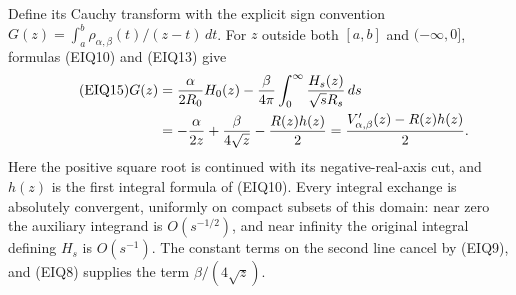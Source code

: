 Define its Cauchy transform with the explicit sign convention
$G(z)=\int_a^b\rho_{\alpha,\beta}(t)/(z-t)\,dt$.
For $z$ outside both $[a,b]$ and $(-\infty,0]$, formulas (EIQ10) and
(EIQ13) give
\begin{align}\tag{EIQ15}
 G(z)
 &=\frac\alpha{2R_0}H_0(z)
       -\frac\beta{4\pi}
          \int_0^\infty\frac{H_s(z)}{\sqrt sR_s}\,ds\\
 &=-\frac\alpha{2z}+\frac\beta{4\sqrt z}
       -\frac{R(z)h(z)}2
 =\frac{V'_{\alpha,\beta}(z)-R(z)h(z)}2.\notag
\end{align}
Here the positive square root is continued with its negative-real-axis
cut, and $h(z)$ is the first integral formula of (EIQ10).  Every integral
exchange is absolutely convergent, uniformly on compact subsets of this
domain: near zero the auxiliary integrand is $O(s^{-1/2})$, and near
infinity the original integral defining $H_s$ is $O(s^{-1})$.
The constant terms on the second line cancel by (EIQ9), and (EIQ8)
supplies the term $\beta/(4\sqrt z)$.

